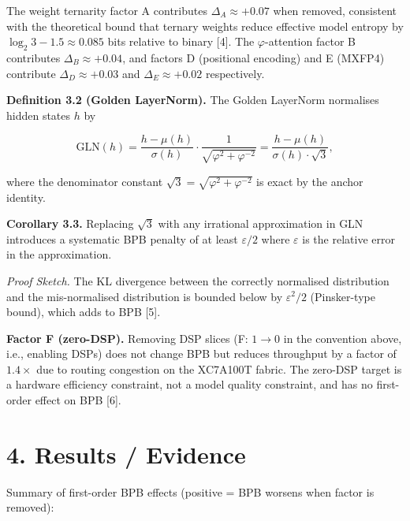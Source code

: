 The weight ternarity factor A contributes
\(\Delta_A \approx +0.07\) when removed,
consistent with the theoretical bound that ternary
weights reduce effective model entropy by
\(\log_2 3 - 1.5 \approx 0.085\) bits relative to
binary [4]. The \(\varphi\)-attention factor B
contributes \(\Delta_B \approx +0.04\), and
factors D (positional encoding) and E (MXFP4)
contribute \(\Delta_D \approx +0.03\) and
\(\Delta_E \approx +0.02\) respectively.

\textbf{Definition 3.2 (Golden LayerNorm).} The
Golden LayerNorm normalises hidden states \(h\) by

\[\text{GLN}(h) = \frac{h - \mu(h)}{\sigma(h)} \cdot \frac{1}{\sqrt{\varphi^2 + \varphi^{-2}}} = \frac{h - \mu(h)}{\sigma(h) \cdot \sqrt{3}},\]

where the denominator constant
\(\sqrt{3} = \sqrt{\varphi^2 + \varphi^{-2}}\) is
exact by the anchor identity.

\textbf{Corollary 3.3.} Replacing \(\sqrt{3}\)
with any irrational approximation in GLN
introduces a systematic BPB penalty of at least
\(\varepsilon/2\) where \(\varepsilon\) is the
relative error in the approximation.

\emph{Proof Sketch.} The KL divergence between the
correctly normalised distribution and the
mis-normalised distribution is bounded below by
\(\varepsilon^2/2\) (Pinsker-type bound), which
adds to BPB [5].

\textbf{Factor F (zero-DSP).} Removing DSP slices
(F: \(1 \to 0\) in the convention above, i.e.,
enabling DSPs) does not change BPB but reduces
throughput by a factor of \(1.4\times\) due to
routing congestion on the XC7A100T fabric. The
zero-DSP target is a hardware efficiency
constraint, not a model quality constraint, and
has no first-order effect on BPB [6].

\section{4. Results /
Evidence}\label{results-evidence}

Summary of first-order BPB effects (positive = BPB
worsens when factor is removed):

